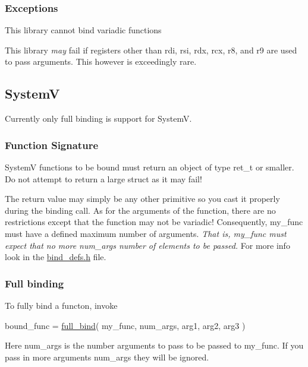 \subsubsection*{Exceptions}


\begin{DoxyEnumerate}
\item This library cannot bind variadic functions
\end{DoxyEnumerate}
\begin{DoxyEnumerate}
\item This library {\itshape may} fail if registers other than {\ttfamily rdi}, {\ttfamily rsi,} {\ttfamily rdx}, {\ttfamily rcx}, {\ttfamily r8}, and {\ttfamily r9} are used to pass arguments. This however is exceedingly rare.
\end{DoxyEnumerate}

\subsection*{SystemV}

Currently only full binding is support for SystemV.

\subsubsection*{Function Signature}

SystemV functions to be bound must return an object of type {\ttfamily ret\+\_\+t} or smaller. Do not attempt to return a large struct as it may fail!

The return value may simply be any other primitive so you cast it properly during the binding call. As for the arguments of the function, there are no restrictions except that the function may not be variadic! Consequently, {\ttfamily my\+\_\+func} must have a defined maximum number of \textquotesingle{}arguments\textquotesingle{}. {\itshape That is, {\ttfamily my\+\_\+func} must expect that no more {\ttfamily num\+\_\+args} number of elements to be passed.} For more info look in the {\ttfamily \hyperlink{bind__defs_8h}{bind\+\_\+defs.\+h}} file.

\subsubsection*{Full binding}

To fully bind a functon, invoke 
\begin{DoxyCode}
bound\_func = \hyperlink{bind_8c_aba8492ffd71864427a5cddc0c3888454}{full\_bind}( my\_func, num\_args, arg1, arg2, arg3 )
\end{DoxyCode}
 Here {\ttfamily num\+\_\+args} is the number arguments to pass to be passed to {\ttfamily my\+\_\+func}. If you pass in more arguments {\ttfamily num\+\_\+args} they will be ignored.

